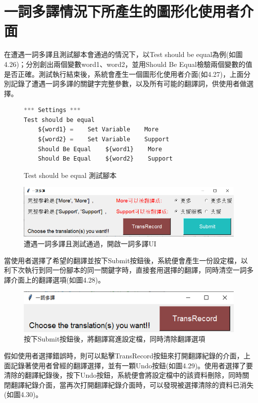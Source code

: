 \section{一詞多譯情況下所產生的圖形化使用者介面}
在遭遇一詞多譯且測試腳本會通過的情況下，以Test should be equal為例(如圖4.26)；分別創出兩個變數word1、word2，並用Should Be Equal檢驗兩個變數的值是否正確。測試執行結束後，系統會產生一個圖形化使用者介面(如4.27)，上面分別記錄了遭遇一詞多譯的關鍵字完整參數，以及所有可能的翻譯詞，供使用者做選擇。\\

\begin{figure}[H]
\begin{lstlisting}[language={python}]
*** Settings ***
Test should be equal
    ${word1} =    Set Variable    More
    ${word2} =    Set Variable    Support
    Should Be Equal    ${word1}    More
    Should Be Equal    ${word2}    Support
\end{lstlisting}
\caption{Test should be equal 測試腳本}
\end{figure}

\begin{figure}[H]
\includegraphics[width= \textwidth]{../論文截圖/4-3-2 測試通過且有一詞多譯時，UI會跳出.png}
\caption{遭遇一詞多譯且測試通過，開啟一詞多譯UI}
\end{figure}

當使用者選擇了希望的翻譯並按下Submit按鈕後，系統便會產生一份設定檔，以利下次執行到同一份腳本的同一關鍵字時，直接套用選擇的翻譯，同時清空一詞多譯介面上的翻譯選項(如圖4.28)。

\begin{figure}[H]
\includegraphics[width= \textwidth]{../論文截圖/4-3-3 選擇翻譯後，清空選項.png}
\caption{按下Submit按鈕後，將翻譯寫進設定檔，同時清除翻譯選項}
\end{figure}

假如使用者選擇錯誤時，則可以點擊TransRecord按鈕來打開翻譯紀錄的介面，上面記錄著使用者曾經的翻譯選擇，並有一顆Undo按鈕(如圖4.29)。使用者選擇了要清除的翻譯紀錄後，按下Undo按鈕，系統便會將設定檔中的該資料刪除，同時關閉翻譯紀錄介面，當再次打開翻譯紀錄介面時，可以發現被選擇清除的資料已消失(如圖4.30)。

